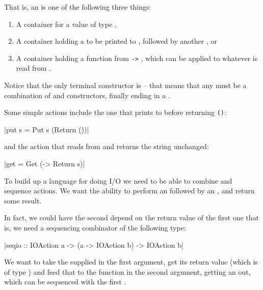 \documentclass[thesis-solanki.tex]{subfiles}
\begin{document}
That is, an  is one of the following three things:
\begin{enumerate}
\item A container for a value of type ,

\item A container holding a  to be printed to ,
  followed by another , or

\item A container holding a function from  \Verb!->! , which can be applied
  to whatever  is read from . 
\end{enumerate}

Notice that the only terminal constructor is  --
that means that any  must be a combination of  and  constructors, 
finally ending in a .

Some simple actions include the one that prints to  before returning \Verb!()!:

|put s = Put s (Return ())|

and the action that reads from  and returns the string unchanged:

|get = Get (\s -> Return s)|

To build up a language for doing I/O we need to be able to combine and sequence actions. We want the ability to perform an   
followed by an  , and return some result.

In fact, we could have the second  depend on the return value of the first one 
that is, we need a sequencing combinator of the 
following type:

|seqio :: IOAction a -> (a -> IOAction b) -> IOAction b|

We want to take the   supplied in the first argument, get its return value (which is of type ) and feed that to the function in 
the second argument, getting an   out, which can be sequenced with the first  .
\end{document}
